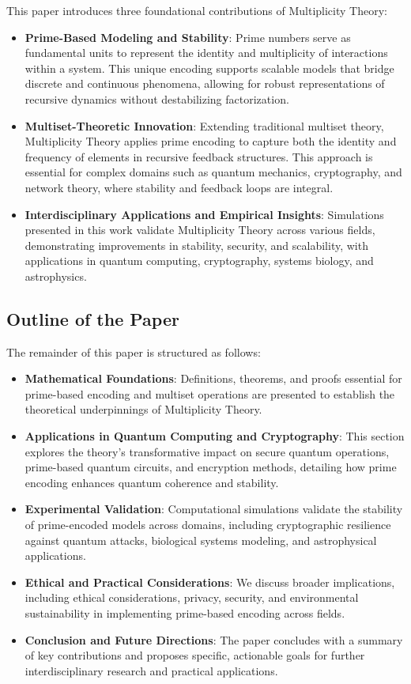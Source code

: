 \documentclass{article}
\begin{document}
This paper introduces three foundational contributions of Multiplicity Theory:

\begin{itemize}
    \item \textbf{Prime-Based Modeling and Stability}: Prime numbers serve as fundamental units to represent the identity and multiplicity of interactions within a system. This unique encoding supports scalable models that bridge discrete and continuous phenomena, allowing for robust representations of recursive dynamics without destabilizing factorization.
    \item \textbf{Multiset-Theoretic Innovation}: Extending traditional multiset theory, Multiplicity Theory applies prime encoding to capture both the identity and frequency of elements in recursive feedback structures. This approach is essential for complex domains such as quantum mechanics, cryptography, and network theory, where stability and feedback loops are integral.
    \item \textbf{Interdisciplinary Applications and Empirical Insights}: Simulations presented in this work validate Multiplicity Theory across various fields, demonstrating improvements in stability, security, and scalability, with applications in quantum computing, cryptography, systems biology, and astrophysics.
\end{itemize}

\subsection{Outline of the Paper}

The remainder of this paper is structured as follows:

\begin{itemize}
    \item \textbf{Mathematical Foundations}: Definitions, theorems, and proofs essential for prime-based encoding and multiset operations are presented to establish the theoretical underpinnings of Multiplicity Theory.
    \item \textbf{Applications in Quantum Computing and Cryptography}: This section explores the theory’s transformative impact on secure quantum operations, prime-based quantum circuits, and encryption methods, detailing how prime encoding enhances quantum coherence and stability.
    \item \textbf{Experimental Validation}: Computational simulations validate the stability of prime-encoded models across domains, including cryptographic resilience against quantum attacks, biological systems modeling, and astrophysical applications.
    \item \textbf{Ethical and Practical Considerations}: We discuss broader implications, including ethical considerations, privacy, security, and environmental sustainability in implementing prime-based encoding across fields.
    \item \textbf{Conclusion and Future Directions}: The paper concludes with a summary of key contributions and proposes specific, actionable goals for further interdisciplinary research and practical applications.
\end{itemize}
\end{document}
